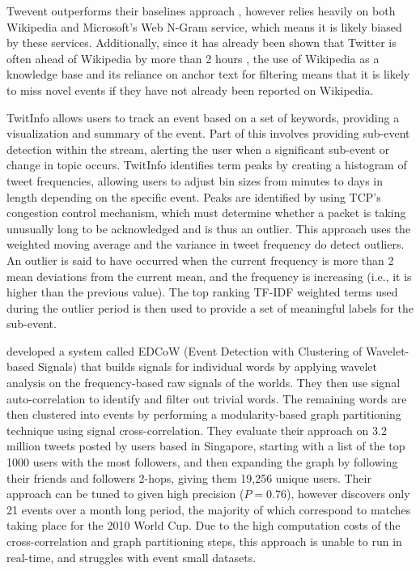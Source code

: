 Twevent outperforms their baselines approach \citep{weng2011event}, however relies heavily on both Wikipedia and Microsoft's Web N-Gram service, which means it is likely biased by these services.
Additionally, since it has already been shown that Twitter is often ahead of Wikipedia by more than 2 hours \citep{WRN2012:osbornebieber}, the use of Wikipedia as a knowledge base and its reliance on anchor text for filtering means that it is likely to miss novel events if they have not already been reported on Wikipedia.

TwitInfo \citep{marcus2011twitinfo} allows users to track an event based on a set of keywords, providing a visualization and summary of the event.
Part of this involves providing sub-event detection within the stream, alerting the user when a significant sub-event or change in topic occurs.
TwitInfo identifies term peaks by creating a histogram of tweet frequencies, allowing users to adjust bin sizes from minutes to days in length depending on the specific event.
Peaks are identified by using TCP's congestion control mechanism, which must determine whether a packet is taking unusually long to be acknowledged and is thus an outlier.
This approach uses the weighted moving average and the variance in tweet frequency do detect outliers.
An outlier is said to have occurred when the current frequency is more than 2 mean deviations from the current mean, and the frequency is increasing (i.e., it is higher than the previous value).
The top ranking TF-IDF weighted terms used during the outlier period is then used to provide a set of meaningful labels for the sub-event.

\cite{weng2011event} developed a system called EDCoW (Event Detection with Clustering of Wavelet-based Signals) that builds signals for individual words by applying wavelet analysis on the frequency-based raw signals of the worlds.
They then use signal auto-correlation to identify and filter out trivial words.
The remaining words are then clustered into events by performing a modularity-based graph partitioning technique using signal cross-correlation.
They evaluate their approach on 3.2 million tweets posted by users based in Singapore, starting with a list of the top 1000 users with the most followers, and then expanding the graph by following their friends and followers 2-hops, giving them 19,256 unique users.
Their approach can be tuned to given high precision ($P = 0.76$), however discovers only 21 events over a month long period, the majority of which correspond to matches taking place for the 2010 World Cup.
Due to the high computation costs of the cross-correlation and graph partitioning steps, this approach is unable to run in real-time, and struggles with event small datasets.

